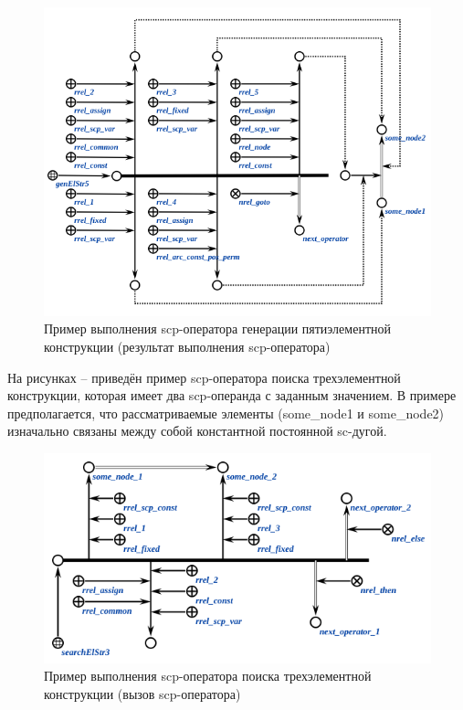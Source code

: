 \begin{figure}[H]
	\centering
	\includegraphics[scale=0.8]{images/part3/chapter_situation_management/genElStr5_fafaa_2.png}
	\caption{Пример выполнения scp-оператора генерации пятиэлементной конструкции (результат выполнения scp-оператора)}
	\label{fig:genElStr5_fafaa_2}
\end{figure}

На рисунках \textit{} -- \textit{} приведён пример scp-оператора поиска трехэлементной конструкции, которая имеет два scp-операнда с заданным значением. В примере предполагается, что рассматриваемые элементы (some\_node1 и some\_node2) изначально связаны между собой константной постоянной sc-дугой.

\begin{figure}[H]
	\centering
	\includegraphics[scale=0.8]{images/part3/chapter_situation_management/searchElStr3_faf.png}
	\caption{Пример выполнения scp-оператора поиска трехэлементной конструкции (вызов scp-оператора)}
	\label{fig:searchElStr3_faf}
\end{figure}

